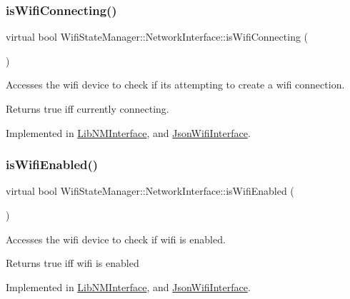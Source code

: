 \subsubsection{\texorpdfstring{is\+Wifi\+Connecting()}{isWifiConnecting()}}
{\footnotesize\ttfamily virtual bool Wifi\+State\+Manager\+::\+Network\+Interface\+::is\+Wifi\+Connecting (\begin{DoxyParamCaption}{ }\end{DoxyParamCaption})\hspace{0.3cm}{\ttfamily [pure virtual]}}

Accesses the wifi device to check if it\textquotesingle{}s attempting to create a wifi connection.

\begin{DoxyReturn}{Returns}
true iff currently connecting. 
\end{DoxyReturn}


Implemented in \mbox{\hyperlink{classLibNMInterface_a78c4b23cbf834a6352c5351b7aedb1c1}{Lib\+N\+M\+Interface}}, and \mbox{\hyperlink{classJsonWifiInterface_ae39dde05b32eb35e755c79a947210dc4}{Json\+Wifi\+Interface}}.

\mbox{\label{classWifiStateManager_1_1NetworkInterface_aefcafd5baac9715524c60d65b0f523ce}} 
\subsubsection{\texorpdfstring{is\+Wifi\+Enabled()}{isWifiEnabled()}}
{\footnotesize\ttfamily virtual bool Wifi\+State\+Manager\+::\+Network\+Interface\+::is\+Wifi\+Enabled (\begin{DoxyParamCaption}{ }\end{DoxyParamCaption})\hspace{0.3cm}{\ttfamily [pure virtual]}}

Accesses the wifi device to check if wifi is enabled.

\begin{DoxyReturn}{Returns}
true iff wifi is enabled 
\end{DoxyReturn}


Implemented in \mbox{\hyperlink{classLibNMInterface_aded8fa727a07bfac38828815bf607c61}{Lib\+N\+M\+Interface}}, and \mbox{\hyperlink{classJsonWifiInterface_ab5b5756ab6c456dbf25d93233b237d40}{Json\+Wifi\+Interface}}.

